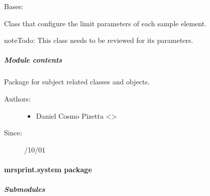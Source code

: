 \documentclass[a4paper,10pt,english]{sphinxmanual}
\begin{document}

\begin{fulllineitems}
\label{\detokenize{autodoc/mrsprint/mrsprint.subject:mrsprint.subject.sample.SampleElementConfig}}
Bases: 

Class that configure the limit parameters of each sample element.

\begin{sphinxadmonition}{note}{\label{autodoc/mrsprint/mrsprint.subject:index-3}Todo:}
This class needs to be reviewed for its parameters.
\end{sphinxadmonition}

\end{fulllineitems}



\subparagraph{Module contents}
\label{\detokenize{autodoc/mrsprint/mrsprint.subject:module-mrsprint.subject}}\label{\detokenize{autodoc/mrsprint/mrsprint.subject:module-contents}}
Package for subject related classes and objects.
\begin{description}
\item[{Authors:}] \leavevmode\begin{itemize}
\item {} 
Daniel Cosmo Pizetta \textless{}\textgreater{}

\end{itemize}

\item[{Since:}] /10/01

\end{description}


\paragraph{mrsprint.system package}
\label{\detokenize{autodoc/mrsprint/mrsprint.system:mrsprint-system-package}}\label{\detokenize{autodoc/mrsprint/mrsprint.system::doc}}

\subparagraph{Submodules}
\label{\detokenize{autodoc/mrsprint/mrsprint.system:submodules}}
\end{document}
